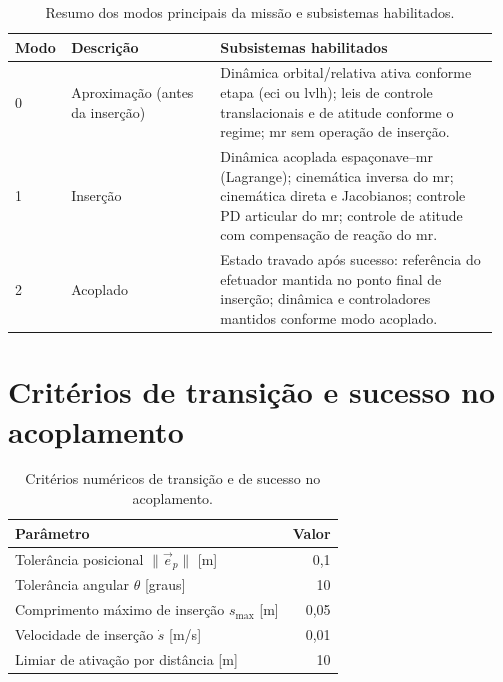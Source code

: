 \begin{table}[H]
\centering
\caption{Resumo dos modos principais da missão e subsistemas habilitados.}
\label{ttab_apD_modos_missao}
\small
\begin{tabular}{p{0.10\linewidth}p{0.30\linewidth}p{0.56\linewidth}}
\toprule
\textbf{Modo} & \textbf{Descrição} & \textbf{Subsistemas habilitados} \\
\midrule
0 & Aproximação (antes da inserção) &
Dinâmica orbital/relativa ativa conforme etapa (\gls{eci} ou \gls{lvlh}); leis de controle translacionais e de atitude conforme o regime; \gls{mr} sem operação de inserção. \\
1 & Inserção &
Dinâmica acoplada espaçonave--\gls{mr} (Lagrange); cinemática inversa do \gls{mr}; cinemática direta e Jacobianos; controle PD articular do \gls{mr}; controle de atitude com compensação de reação do \gls{mr}. \\
2 & Acoplado &
Estado travado após sucesso: referência do efetuador mantida no ponto final de inserção; dinâmica e controladores mantidos conforme modo acoplado. \\
\bottomrule
\end{tabular}
\end{table}

\section{Critérios de transição e sucesso no acoplamento}
\label{apD_criterios_transicao_docking}

\begin{table}[H]
\centering
\caption{Critérios numéricos de transição e de sucesso no acoplamento.}
\label{ttab_apD_criterios_docking}
\begin{tabular}{lr}
\toprule
\textbf{Parâmetro} & \textbf{Valor} \\
\midrule
Tolerância posicional $\|\vec{e}_p\|$ [m] & 0,1 \\
Tolerância angular $\theta$ [graus] & 10 \\
Comprimento máximo de inserção $s_{\max}$ [m] & 0,05 \\
Velocidade de inserção $\dot{s}$ [m/s] & 0,01 \\
Limiar de ativação por distância [m] & 10 \\
\bottomrule
\end{tabular}
\end{table}


